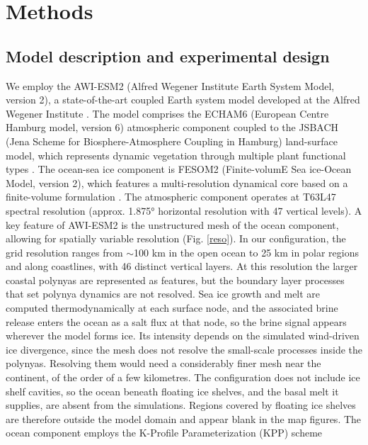 \documentclass[pdflatex,sn-nature]{sn-jnl}
\begin{document}
\section{Methods}

\subsection{Model description and experimental design}

We employ the AWI-ESM2 (Alfred Wegener Institute Earth System Model, version 2), a state-of-the-art coupled Earth system model developed at the Alfred Wegener Institute \cite{sidorenko2019evaluation}. The model comprises the ECHAM6 (European Centre Hamburg model, version 6) atmospheric component \cite{stevens2013atmospheric} coupled to the JSBACH (Jena Scheme for Biosphere-Atmosphere Coupling in Hamburg) land-surface model, which represents dynamic vegetation through multiple plant functional types \cite{brovkin2009global,reick2021jsbach}. The ocean-sea ice component is FESOM2 (Finite-volumE Sea ice-Ocean Model, version 2), which features a multi-resolution dynamical core based on a finite-volume formulation \cite{danilov2017finite}. The atmospheric component operates at T63L47 spectral resolution (approx. 1.875° horizontal resolution with 47 vertical levels). A key feature of AWI-ESM2 is the unstructured mesh of the ocean component, allowing for spatially variable resolution (Fig. \ref{reso}). In our configuration, the grid resolution ranges from $\sim$100 km in the open ocean to 25 km in polar regions and along coastlines, with 46 distinct vertical layers. At this resolution the larger coastal polynyas are represented as features, but the boundary layer processes that set polynya dynamics are not resolved. Sea ice growth and melt are computed thermodynamically at each surface node, and the associated brine release enters the ocean as a salt flux at that node, so the brine signal appears wherever the model forms ice. Its intensity depends on the simulated wind-driven ice divergence, since the mesh does not resolve the small-scale processes inside the polynyas. Resolving them would need a considerably finer mesh near the continent, of the order of a few kilometres. The configuration does not include ice shelf cavities, so the ocean beneath floating ice shelves, and the basal melt it supplies, are absent from the simulations. Regions covered by floating ice shelves are therefore outside the model domain and appear blank in the map figures.
  The ocean component employs the K-Profile Parameterization (KPP) scheme
\end{document}
